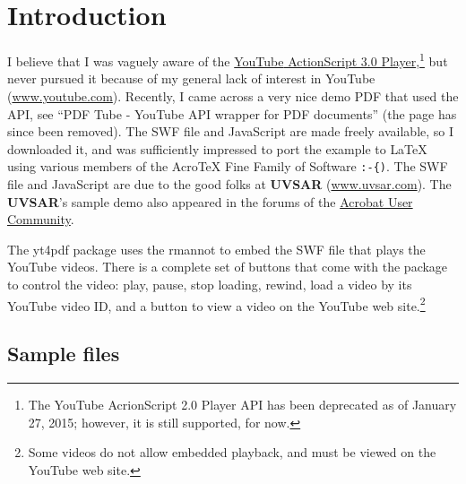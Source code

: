 \documentclass{article}
\newcommand{\YouTube}{\textsf{YouTube}}
\begin{document}
\maketitle

\tableofcontents
{}

\section{Introduction}\label{s:intro}

 I believe that I was vaguely aware of the \href{http://code.google.com/apis/youtube/flash_api_reference.html}
{{\YouTube} ActionScript 3.0 Player},\footnote{The YouTube AcrionScript 2.0 Player API
 has been deprecated as of January 27, 2015; however, it is still supported, for now.} but never pursued it because of my
general lack of interest in {\YouTube} (\url{www.youtube.com}). Recently, I
came across a very nice demo PDF that used the API, see
``PDF Tube - {\YouTube} API wrapper for PDF documents'' (the page has
since been removed).
The SWF file and JavaScript are made freely available, so I
downloaded it, and was sufficiently impressed to port the example to
{\LaTeX} using various members of the {Acro\negthinspace\TeX} Fine Family of Software
\verb!:-{)!. The SWF file and JavaScript are due to the good folks at
\textbf{UVSAR} (\url{www.uvsar.com}). The \textbf{UVSAR}'s sample demo also appeared in the forums of
the \href{http://acrobatusers.com/forum/javascript/embed-youtube-video-pdf}{Acrobat User
Community}.

The \textsf{yt4pdf} package uses the \textsf{rmannot} to embed the \textsf{SWF}
file that plays the {\YouTube} videos.  There is a complete set of buttons
that come with the package to control the video: play, pause, stop
loading, rewind, load a video by its {\YouTube} video ID, and a button to
view a video on the {\YouTube} web site.\footnote{Some videos do not allow
embedded playback, and must be viewed on the {\YouTube} web site.}


\subsection{Sample files}
\end{document}
